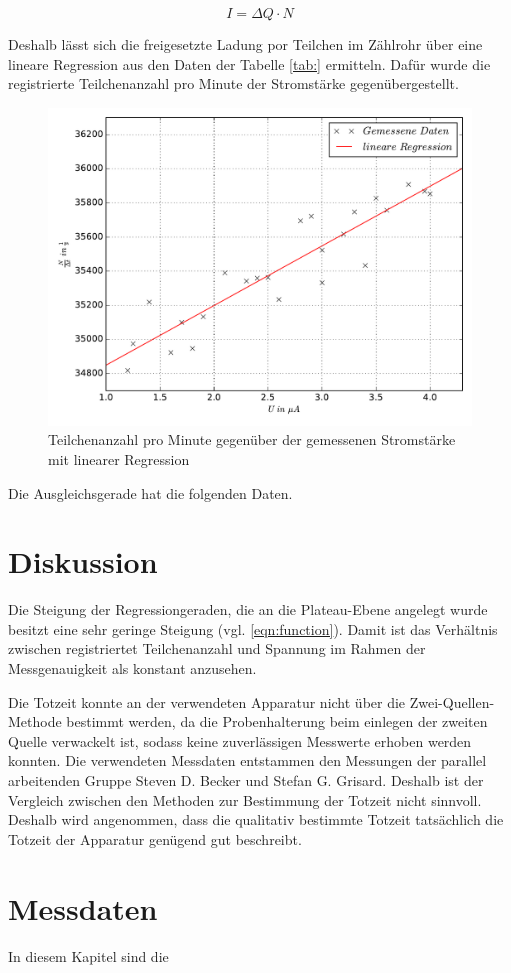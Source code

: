 \begin{equation*}
  I = \Delta Q \cdot N
\end{equation*}

Deshalb lässt sich die freigesetzte Ladung por Teilchen im Zählrohr über eine
lineare Regression aus den Daten der Tabelle \ref{tab:} ermitteln.
Dafür wurde die registrierte Teilchenanzahl pro Minute der Stromstärke
gegenübergestellt.

\begin{figure}
  \centering
  \includegraphics[width=\textwidth]{Stromstärke_gegen_Anzahl.pdf}
  \caption{Teilchenanzahl pro Minute gegenüber der gemessenen Stromstärke mit linearer Regression}
  \label{fig:Stromstärke_gegen_Anzahl}
\end{figure}

Die Ausgleichsgerade hat die folgenden Daten.



\section{Diskussion}

Die Steigung der Regressiongeraden, die an die Plateau-Ebene angelegt wurde
besitzt eine sehr geringe Steigung (vgl. \ref{eqn:function}).
Damit ist das Verhältnis zwischen registriertet Teilchenanzahl und Spannung
im Rahmen der Messgenauigkeit als konstant anzusehen.

Die Totzeit konnte an der verwendeten Apparatur nicht über die Zwei-Quellen-Methode
bestimmt werden, da die Probenhalterung beim einlegen der zweiten Quelle
verwackelt ist, sodass keine zuverlässigen Messwerte erhoben werden konnten.
Die verwendeten Messdaten entstammen den Messungen der parallel arbeitenden
Gruppe Steven D. Becker und Stefan G. Grisard.
Deshalb ist der Vergleich zwischen den Methoden zur Bestimmung der Totzeit
nicht sinnvoll. Deshalb wird angenommen, dass die qualitativ bestimmte
Totzeit tatsächlich die Totzeit der Apparatur genügend gut beschreibt.

\section{Messdaten}

In diesem Kapitel sind die


